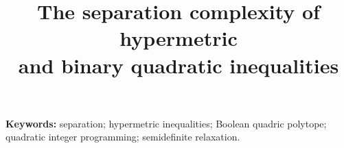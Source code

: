 \documentclass[11pt]{article}
\title{The separation complexity of hypermetric\\
and binary quadratic inequalities}
\author{}
\date{}
\begin{document}
\maketitle

\medskip
\noindent\textbf{Keywords:} separation; hypermetric inequalities; Boolean quadric polytope; quadratic integer programming; semidefinite relaxation.









\end{document}
